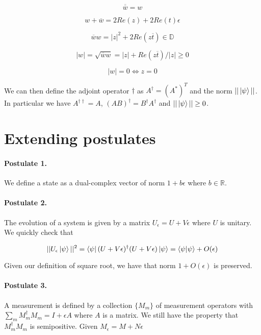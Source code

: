 \documentclass{article}
\newcommand{\R}{\mathbb{R}}
\newcommand{\D}{\mathbb{D}}
\newcommand{\e}{\epsilon}
\renewcommand{\bar}{\overline}
\begin{document}
\begin{equation}
\bar{\bar{w}} = w
\end{equation}

\begin{equation}
w + \bar{w} = 2 Re(z) + 2 Re(t) \e
\end{equation}

\begin{equation}
\bar{w}w = |z|^2 + 2 Re(z\bar{t}) \in \D
\end{equation}

\begin{equation}
|w| = \sqrt{\bar{w}w} = |z| + Re(z\bar{t})/|z| \geq 0
\end{equation}

\begin{equation}
|w| = 0 \iff z = 0
\end{equation}

We can then define the adjoint operator $\dagger$ as $A^\dagger = (A^*)^T$ and the norm $||\ket{\psi}||$. In particular we have $A^{\dagger \dagger} = A$, $(AB)^\dagger = B^\dagger A^\dagger$ and $||\ket{\psi}|| \geq 0$.

\section{Extending postulates}

\paragraph{Postulate 1.} We define a state as a dual-complex vector of norm $1 + b \e$ where $b \in \R$.

\paragraph{Postulate 2.} The evolution of a system is given by a matrix $U_{\e} = U + V \e$ where $U$ is unitary. We quickly check that

\begin{equation}
||U_{\e} \ket{\psi}||^2 = \bra{\psi} (U + V \e)^\dagger (U + V \e) \ket{\psi} = \braket{\psi | \psi} + O(\e)
\end{equation}

Given our definition of square root, we have that norm $1 + O(\e)$ is preserved.

\paragraph{Postulate 3.} A measurement is defined by a collection $\{M_m\}$ of measurement operators with $\sum_m M_m^\dagger M_m = I + \e A$ where $A$ is a matrix. We still have the property that $M_m^\dagger M_m$ is semipositive. Given $M_{\e} = M + N \e$
\end{document}
